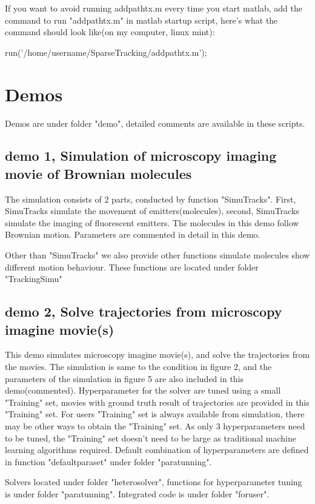 \documentclass[a4paper]{article}
\begin{document}
\begin{CJK*}{UTF8}{kai}
If you want to avoid running addpathtx.m every time you start matlab, add the command to run "addpathtx.m" in matlab startup script, here's what the command should look like(on my computer, linux mint):

run('/home/username/SparseTracking/addpathtx.m');

\section{Demos}
Demos are under folder "demo", detailed comments are available in these scripts.

\subsection{demo 1, Simulation of microscopy imaging movie of Brownian molecules}
The simulation consists of 2 parts, conducted by function "SimuTracks". First, SimuTracks simulate the movement of emitters(molecules), second, SimuTracks simulate the imaging of fluorescent emitters. The molecules in this demo follow Brownian motion. Parameters are commented in detail in this demo.

Other than "SimuTracks" we also provide other functions simulate molecules show different motion behaviour. These functions are located under folder "TrackingSimu"

\subsection{demo 2, Solve trajectories from microscopy imagine movie(s)}
This demo simulates microscopy imagine movie(s), and solve the trajectories from the movies. The simulation is same to the condition in figure 2, and the parameters of the simulation in figure 5 are also included in this demo(commented). Hyperparameter for the solver are tuned using a small "Training" set, movies with ground truth result of trajectories are provided in this "Training" set. For users "Training" set is always available from simulation, there may be other ways to obtain the "Training" set. As only 3 hyperparameters need to be tuned, the "Training" set doesn't need to be large as traditional machine learning algorithms required. Default combination of hyperparameters are defined in function "defaultparaset" under folder "paratunning".

Solvers located under folder "heterosolver", functions for hyperparameter tuning is under folder "paratunning". Integrated code is under folder "foruser".


\end{CJK*}
\end{document}
